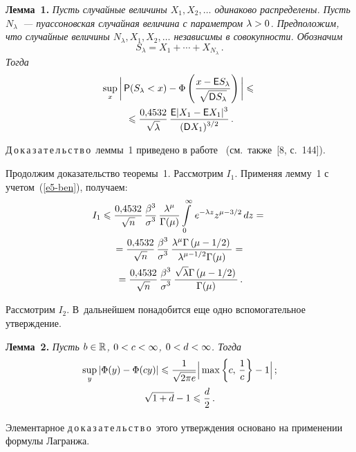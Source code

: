 \begin{multicols}{2}
\smallskip

\noindent
\textbf{Лемма~1.} \textit{Пусть случайные величины $X_1,X_2,\ldots$
одинаково распределены. Пусть $N_{\lambda}$~--- пуассоновская
случайная величина с параметром $\lambda\hm>0$. Предположим, что
случайные величины $N_{\lambda},X_1,X_2,\ldots$ независимы в
совокупности. Обозначим
$$
S_{\lambda}=X_1+\cdots+X_{N_{\lambda}}\,.
$$
Тогда}
\begin{multline*}
\sup\limits_x\bigg|\,{\sf P}(S_{\lambda}<x)-\Phi\left(\displaystyle\frac{\displaystyle x-{\sf
E}S_{\lambda}\mathstrut}{\displaystyle \sqrt{{\sf D}S_{\lambda}}\mathstrut}\right)\bigg|
\leqslant{}\\
{}\leqslant
\displaystyle\frac{\displaystyle 0{,}4532\mathstrut}{\displaystyle \sqrt{\lambda}\mathstrut}\,
\displaystyle\frac{\displaystyle {\sf E}|X_1-{\sf E}X_1|^3\mathstrut}{\displaystyle ({\sf D}X_1)^{3/2}\mathstrut}\,.
\end{multline*}

\smallskip

\noindent
Д\,о\,к\,а\,з\,а\,т\,е\,л\,ь\,с\,т\,в\,о\ леммы~1 приведено в 
работе~\cite{KorolevShevtsovaShorgin2011}
(см.\ также~[8, с.~144]).

\smallskip

Продолжим доказательство теоремы~1. Рас\-смот\-рим $I_1$. Применяя лемму~1 с учетом~(\ref{e5-ben}),
получаем:
\begin{multline}
I_1\leqslant\displaystyle\frac{\displaystyle 0{,}4532\mathstrut}{\displaystyle \sqrt{n}\mathstrut}\,
\displaystyle\frac{\displaystyle \beta^3\mathstrut}{\displaystyle \sigma^3\mathstrut}\,
\displaystyle\frac{\displaystyle \lambda^{\mu}\mathstrut}{\displaystyle \Gamma(\mu)\mathstrut}\int\limits_{0}^{\infty}\,
e^{-\lambda z}z^{\mu-3/2}\,dz={}\\
{}=
\displaystyle\frac{\displaystyle 0{,}4532\mathstrut}{\displaystyle \sqrt{n}\mathstrut}\,
\displaystyle\frac{\displaystyle \beta^3\mathstrut}{\displaystyle \sigma^3\mathstrut}\,
\displaystyle\frac{\displaystyle \lambda^{\mu}\Gamma\left(\mu-{1}/{2}\right)\mathstrut}{\displaystyle \lambda^{\mu-1/2}\Gamma(\mu)\mathstrut}={}\\
{}=
\displaystyle\frac{\displaystyle 0{,}4532\mathstrut}{\displaystyle \sqrt{n}\mathstrut}\,\displaystyle\frac{\displaystyle \beta^3\mathstrut}{\displaystyle \sigma^3\mathstrut}\,
\displaystyle\frac{\displaystyle \sqrt{\lambda}\Gamma\left(\mu-{1}/{2}\right)\mathstrut}{\displaystyle \Gamma(\mu)\mathstrut}\,.
\label{e7-ben}
\end{multline}

Рассмотрим $I_2$. В~дальнейшем понадобится еще одно вспомогательное
утверждение.

\smallskip

\noindent
\textbf{Лемма~2.} \textit{Пусть $b\hm\in\r$, $0\hm<c\hm<\infty$, $0\hm<d\hm<\infty$.
Тогда}
\begin{gather}
\sup\limits_y|\Phi(y)-\Phi(cy)|\leqslant\displaystyle\frac{\displaystyle 1\mathstrut}{\displaystyle \sqrt{2\pi e}\mathstrut}
\Big|\max\left\{c,\,\displaystyle\frac{\displaystyle 1\mathstrut}{\displaystyle c\mathstrut}\right\}-1\Big|\,;\label{e8-ben}
\\
\sqrt{1+d}-1\leqslant\displaystyle\frac{\displaystyle d\mathstrut}{\displaystyle 2\mathstrut}\,.\label{e9-ben}
\end{gather}

\smallskip

\noindent
Элементарное д\,о\,к\,а\,з\,а\,т\,е\,л\,ь\,с\,т\,в\,о\ этого утверждения основано
на применении формулы Лагранжа.


\end{multicols}
